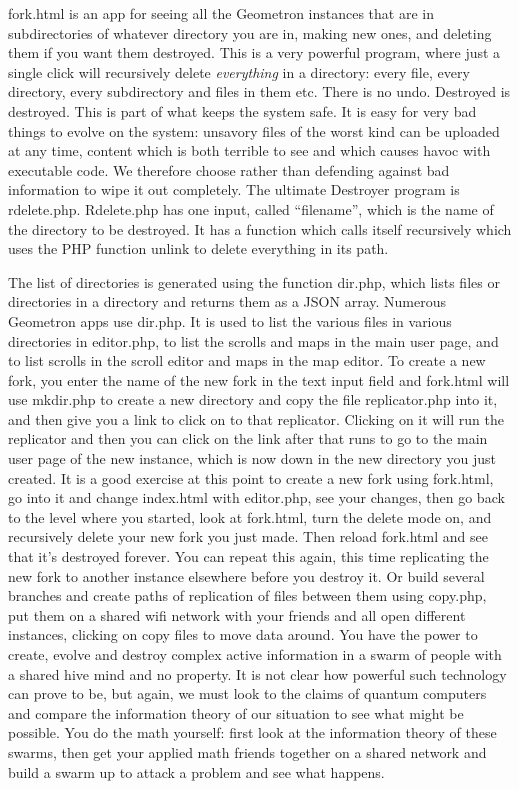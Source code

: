 fork.html is an app for seeing all the Geometron instances that are in subdirectories of whatever directory you are in, making new ones, and deleting them if you want them destroyed. This is a very powerful program, where just a single click will recursively delete \emph{everything} in a directory: every file, every directory, every subdirectory and files in them etc. There is no undo.  Destroyed is destroyed.  This is part of what keeps the system safe.  It is easy for very bad things to evolve on the system: unsavory files of the worst kind can be uploaded at any time, content which is both terrible to see and which causes havoc with executable code.  We therefore choose rather than defending against bad information to wipe it out completely. The ultimate Destroyer program is rdelete.php.  Rdelete.php has one input, called ``filename'', which is the name of the directory to be destroyed.  It has a function which calls itself recursively which uses the PHP function unlink to delete everything in its path. 

The list of directories is generated using the function dir.php, which lists files or directories in a directory and returns them as a JSON array.  Numerous Geometron apps use dir.php.  It is used to list the various files in various directories in editor.php, to list the scrolls and maps in the main user page, and to list scrolls in the scroll editor and maps in the map editor.  To create a new fork, you enter the name of the new fork in the text input field and fork.html will use mkdir.php to create a new directory and copy the file replicator.php into it, and then give you a link to click on to that replicator.  Clicking on it will run the replicator and then you can click on the link after that runs to go to the main user page of the new instance, which is now down in the new directory you just created.  It is a good exercise at this point to create a new fork using fork.html, go into it and change index.html with editor.php, see your changes, then go back to the level where you started, look at fork.html, turn the delete mode on, and recursively delete your new fork you just made. Then reload fork.html and see that it's destroyed forever.  You can repeat this again, this time replicating the new fork to another instance elsewhere before you destroy it.  Or build several branches and create paths of replication of files between them using copy.php, put them on a shared wifi network with your friends and all open different instances, clicking on copy files to move data around.  You have the power to create, evolve and destroy complex active information in a swarm of people with a shared hive mind and no property.  It is not clear how powerful such technology can prove to be, but again, we must look to the claims of quantum computers and compare the information theory of our situation to see what might be possible.  You do the math yourself: first look at the information theory of these swarms, then get your applied math friends together on a shared network and build a swarm up to attack a problem and see what happens.  

